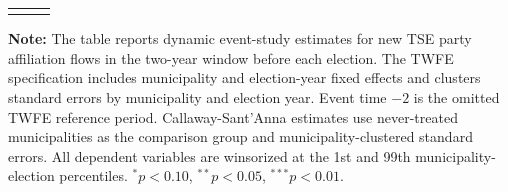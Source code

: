 \begin{table}[htbp]
\begin{tabular*}{0.82\textwidth}{@{\extracolsep{\fill}}lcc}
        \doublebottomrule
    \end{tabular*}
    \vspace{1.1em}
    \begin{minipage}{\textwidth}
        {\footnotesize \textbf{Note:} The table reports dynamic event-study estimates for new TSE party affiliation flows in the two-year window before each election. The TWFE specification includes municipality and election-year fixed effects and clusters standard errors by municipality and election year. Event time $-2$ is the omitted TWFE reference period. Callaway-Sant'Anna estimates use never-treated municipalities as the comparison group and municipality-clustered standard errors. All dependent variables are winsorized at the 1st and 99th municipality-election percentiles. $^{*} p<0.10$, $^{**} p<0.05$, $^{***} p<0.01$. \par}
    \end{minipage}
\end{table}

